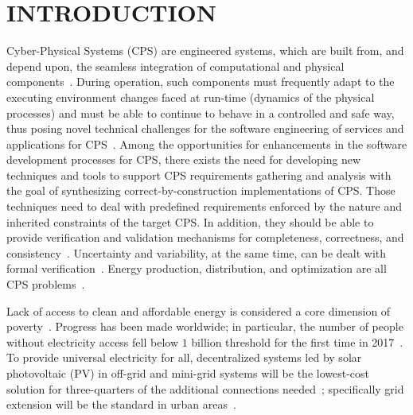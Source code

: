 \documentclass[10pt,conference]{IEEEtran}
\begin{document}
\section{INTRODUCTION}
Cyber-Physical Systems  (CPS) are engineered systems, which are built from, and depend upon, 
the seamless integration of computational  and  physical  components~\cite{NSF2015}. 
During operation, such components must frequently adapt to the executing environment changes 
faced at run-time (dynamics of the physical processes) and must be able to continue to behave 
in a controlled and safe way, thus posing novel technical challenges for the software engineering of services and applications for CPS~\cite{Metzger2014}. %
%
Among the opportunities for enhancements in the software development processes for CPS, there exists the need for developing new techniques and tools to support CPS requirements gathering and analysis with the goal of synthesizing correct-by-construction implementations of CPS. Those techniques need to deal with predefined requirements enforced by the nature and inherited constraints of the target CPS. In addition, they should be able to provide verification and validation mechanisms for completeness, correctness, and consistency~\cite{Al-Jaroodi2016}. Uncertainty and variability, at the same time, can be dealt with formal verification~\cite{NESSI}. Energy production, distribution, and optimization are all CPS problems~\cite{UC}. 

Lack of access to clean and affordable energy is considered a core dimension of poverty~\cite{Hussein2012}. Progress has been made worldwide; in particular, the number of people without electricity access fell below $1$ billion threshold for the first time in 2017~\cite{IEAweo2018}. To provide universal electricity for all, decentralized systems led by solar photovoltaic (PV) in off-grid and mini-grid systems will be the lowest-cost solution for three-quarters of the additional connections needed~\cite{Hussein2012}; specifically grid extension will be the standard in urban areas~\cite{IEAweo2018}.
\end{document}
